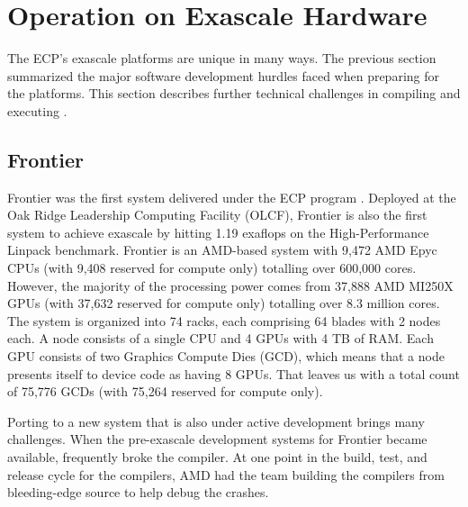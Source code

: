 \section{Operation on Exascale Hardware}

The ECP's exascale platforms are unique in many ways.
The previous section summarized the major software development hurdles faced when preparing for the platforms.
This section describes further technical challenges in compiling and executing \vtkm.


\subsection{Frontier}
Frontier was the first system delivered under the ECP program \citep{Atchley2023}. Deployed at the Oak Ridge Leadership Computing Facility (OLCF), Frontier is also the first system to achieve exascale by hitting 1.19 exaflops on the High-Performance Linpack benchmark.
Frontier is an AMD-based system with 9,472 AMD Epyc CPUs (with 9,408 reserved for compute only) totalling over 600,000 cores.
However, the majority of the processing power comes from 37,888 AMD MI250X GPUs (with 37,632 reserved for compute only) totalling over 8.3 million cores.
The system is organized into 74 racks, each comprising 64 blades with 2 nodes each.
A node consists of a single CPU and 4 GPUs with 4 TB of RAM.
Each GPU consists of two Graphics Compute Dies (GCD), which means that a node presents itself to device code as having 8 GPUs.
That leaves us with a total count of 75,776 GCDs (with 75,264 reserved for compute only).

Porting to a new system that is also under active development brings many challenges.
When the pre-exascale development systems for Frontier became available, \vtkm frequently broke the compiler.
At one point in the build, test, and release cycle for the compilers, AMD had the \vtkm team building the compilers from bleeding-edge source to help debug the crashes.

